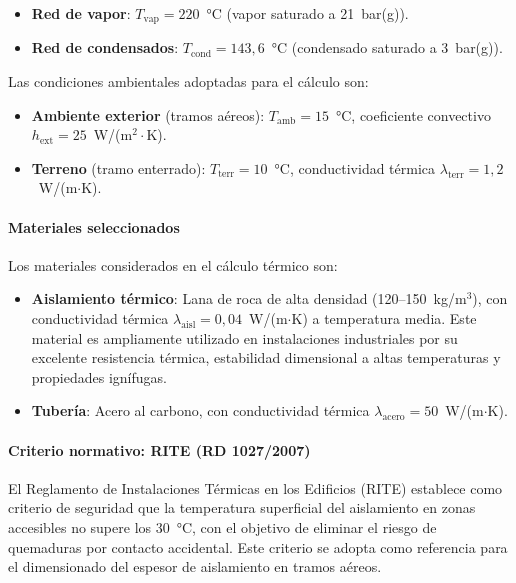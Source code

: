\documentclass[12pt]{article}
\begin{document}
\begin{itemize}[noitemsep]
	\item \textbf{Red de vapor}: $T_{\text{vap}} = 220$~°C (vapor saturado a 21~bar(g)).
	\item \textbf{Red de condensados}: $T_{\text{cond}} = 143{,}6$~°C (condensado saturado a 3~bar(g)).
\end{itemize}

Las condiciones ambientales adoptadas para el cálculo son:

\begin{itemize}[noitemsep]
	\item \textbf{Ambiente exterior} (tramos aéreos): $T_{\text{amb}} = 15$~°C, coeficiente convectivo $h_{\text{ext}} = 25$~W/(m$^2\cdot$K).
	\item \textbf{Terreno} (tramo enterrado): $T_{\text{terr}} = 10$~°C, conductividad térmica $\lambda_{\text{terr}} = 1{,}2$~W/(m$\cdot$K).
\end{itemize}

\paragraph{Materiales seleccionados}
\label{par:materiales_aislamiento}

Los materiales considerados en el cálculo térmico son:

\begin{itemize}[noitemsep]
	\item \textbf{Aislamiento térmico}: Lana de roca de alta densidad (120--150~kg/m$^3$), con conductividad térmica $\lambda_{\text{aisl}} = 0{,}04$~W/(m$\cdot$K) a temperatura media. Este material es ampliamente utilizado en instalaciones industriales por su excelente resistencia térmica, estabilidad dimensional a altas temperaturas y propiedades ignífugas.
	\item \textbf{Tubería}: Acero al carbono, con conductividad térmica $\lambda_{\text{acero}} = 50$~W/(m$\cdot$K).
\end{itemize}

\paragraph{Criterio normativo: RITE (RD 1027/2007)}
\label{par:criterio_rite}

El Reglamento de Instalaciones Térmicas en los Edificios (RITE) \cite{RITE2007} establece como criterio de seguridad que la temperatura superficial del aislamiento en zonas accesibles no supere los 30~°C, con el objetivo de eliminar el riesgo de quemaduras por contacto accidental. Este criterio se adopta como referencia para el dimensionado del espesor de aislamiento en tramos aéreos.
\end{document}

